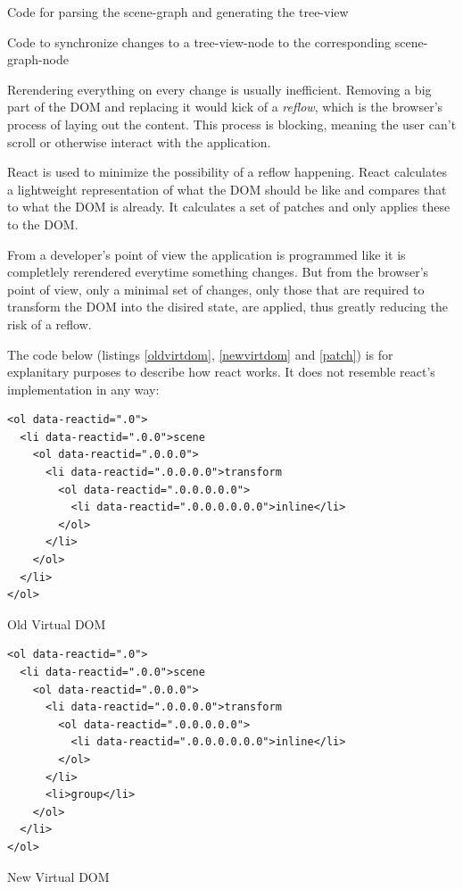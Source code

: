 \begin{enumerate*}
  \item Code for parsing the scene-graph and generating the tree-view
  \item Code to synchronize changes to a tree-view-node to the corresponding scene-graph-node
\end{enumerate*}

Rerendering everything on every change is usually inefficient. Removing a big part
of the \gls{DOM} and replacing it would kick of a \emph{reflow}, which is the browser's
process of laying out the content. This process is blocking, meaning the user can't
scroll or otherwise interact with the application. \cite{reflow}

React is used to minimize the possibility of a reflow happening. React
calculates a lightweight representation of what the \gls{DOM} should be like and
compares that to what the \gls{DOM} is already. It calculates a set of patches and
only applies these to the \gls{DOM}.

From a developer's point of view the application is programmed like it is
completlely rerendered everytime something changes. But from the browser's point
of view, only a minimal set of changes, only those that are required to transform the
\gls{DOM} into the disired state, are applied, thus greatly reducing the risk of a reflow.

The code below (listings \ref{oldvirtdom}, \ref{newvirtdom} and \ref{patch}) is
for explanitary purposes to describe how react works. It does not resemble
react's implementation in any way:

\begin{listing}[H]
  \begin{verbatim}
<ol data-reactid=".0">
  <li data-reactid=".0.0">scene
    <ol data-reactid=".0.0.0">
      <li data-reactid=".0.0.0.0">transform
        <ol data-reactid=".0.0.0.0.0">
          <li data-reactid=".0.0.0.0.0.0">inline</li>
        </ol>
      </li>
    </ol>
  </li>
</ol>
  \end{verbatim}
  \caption{Old Virtual DOM}
  \label{oldvirtdom}
\end{listing}

\begin{listing}[H]
  \begin{verbatim}
<ol data-reactid=".0">
  <li data-reactid=".0.0">scene
    <ol data-reactid=".0.0.0">
      <li data-reactid=".0.0.0.0">transform
        <ol data-reactid=".0.0.0.0.0">
          <li data-reactid=".0.0.0.0.0.0">inline</li>
        </ol>
      </li>
      <li>group</li>
    </ol>
  </li>
</ol>
  \end{verbatim}
  \caption{New Virtual DOM}
  \label{newvirtdom}
\end{listing}

